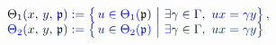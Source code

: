 \documentclass[12pt]{article}
\begin{document}
\makeatletter
\renewcommand*{\@textcolor}[3]{%
  \protect\leavevmode
  \begingroup
    \color#1{#2}#3%
  \endgroup
}
\makeatother
\begin{displaymath}
\begin{array} {rl} & { { \mathcolor[RGB]{0,0,15}{\Theta} _ { \mathcolor[RGB]{0,0,30}{1} } \mathcolor[RGB]{0,0,45}{(} \mathcolor[RGB]{0,0,60}{x} \mathcolor[RGB]{0,0,75}{,} \, \mathcolor[RGB]{0,0,90}{y} \mathcolor[RGB]{0,0,105}{,} \, { \mathfrak { \mathcolor[RGB]{0,0,120}{p} } } \mathcolor[RGB]{0,0,135}{)} \mathcolor[RGB]{0,0,150}{:} \mathcolor[RGB]{0,0,165}{=} \mathcolor[RGB]{0,0,180}{\left\{} \, \mathcolor[RGB]{0,0,195}{u} \mathcolor[RGB]{0,0,210}{\in} \mathcolor[RGB]{0,0,225}{\Theta} _ { \mathcolor[RGB]{0,0,240}{1} } \mathcolor[RGB]{0,0,255}{(} { \mathfrak { \mathcolor[RGB]{0,15,0}{p} } } \mathcolor[RGB]{0,15,15}{)} \ \mathcolor[RGB]{0,15,30}{\big|} \ \mathcolor[RGB]{0,15,45}{\exists} \mathcolor[RGB]{0,15,60}{\gamma} \mathcolor[RGB]{0,15,75}{\in} \mathcolor[RGB]{0,15,90}{\Gamma} \mathcolor[RGB]{0,15,105}{,} \ \mathcolor[RGB]{0,15,120}{u} \mathcolor[RGB]{0,15,135}{x} \mathcolor[RGB]{0,15,150}{=} \mathcolor[RGB]{0,15,165}{\gamma} \mathcolor[RGB]{0,15,180}{y} \mathcolor[RGB]{0,15,195}{\right\}} \mathcolor[RGB]{0,15,210}{,} } } \\ & { { \mathcolor[RGB]{0,15,225}{\Theta} _ { \mathcolor[RGB]{0,15,240}{2} } \mathcolor[RGB]{0,15,255}{(} \mathcolor[RGB]{0,30,0}{x} \mathcolor[RGB]{0,30,15}{,} \, \mathcolor[RGB]{0,30,30}{y} \mathcolor[RGB]{0,30,45}{,} \, { \mathfrak { \mathcolor[RGB]{0,30,60}{p} } } \mathcolor[RGB]{0,30,75}{)} \mathcolor[RGB]{0,30,90}{:} \mathcolor[RGB]{0,30,105}{=} \mathcolor[RGB]{0,30,120}{\left\{} \, \mathcolor[RGB]{0,30,135}{u} \mathcolor[RGB]{0,30,150}{\in} \mathcolor[RGB]{0,30,165}{\Theta} _ { \mathcolor[RGB]{0,30,180}{2} } \mathcolor[RGB]{0,30,195}{(} { \mathfrak { \mathcolor[RGB]{0,30,210}{p} } } \mathcolor[RGB]{0,30,225}{)} \ \mathcolor[RGB]{0,30,240}{\big|} \ \mathcolor[RGB]{0,30,255}{\exists} \mathcolor[RGB]{0,45,0}{\gamma} \mathcolor[RGB]{0,45,15}{\in} \mathcolor[RGB]{0,45,30}{\Gamma} \mathcolor[RGB]{0,45,45}{,} \ \mathcolor[RGB]{0,45,60}{u} \mathcolor[RGB]{0,45,75}{x} \mathcolor[RGB]{0,45,90}{=} \mathcolor[RGB]{0,45,105}{\gamma} \mathcolor[RGB]{0,45,120}{y} \mathcolor[RGB]{0,45,135}{\right\}} } } \end{array}
\end{displaymath}
\end{document}
